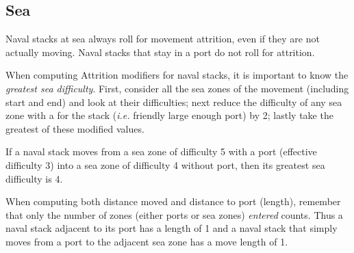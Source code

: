 \subsection{Sea}
Naval stacks at sea always roll for movement attrition, even if they are not
actually moving. Naval stacks that stay in a port do not roll for attrition.

When computing Attrition modifiers for naval stacks, it is important to know
the \emph{greatest sea difficulty}. First, consider all the sea zones of the
movement (including start and end) and look at their difficulties; next reduce
the difficulty of any sea zone with a \SoS for the stack (\emph{i.e.} friendly
large enough port) by 2; lastly take the greatest of these modified values.

\begin{exemple}
  If a naval stack moves from a sea zone of difficulty 5 with a port
  (effective difficulty 3) into a sea zone of difficulty 4 without port, then
  its greatest sea difficulty is 4.
\end{exemple}

When computing both distance moved and distance to port (\LoS length),
remember that only the number of zones (either ports or sea zones)
\emph{entered} counts. Thus a naval stack adjacent to its port has a \LoS
length of 1 and a naval stack that simply moves from a port to the adjacent
sea zone has a move length of 1.

